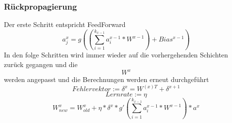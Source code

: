 \subsubsection{Rückpropagierung}
Der erste Schritt entspricht FeedForward
\begin{equation} a_{j}^{x} =  g((\sum_{i=1}^{k_{x-1}} a_{i}^{x-1} * W^{x-1})+Bias^{x-1}) \end{equation}
In den folge Schritten  wird immer wieder auf die vorhergehenden Schichten zurück gegangen und die $$W^{x}$$ werden angepasst und die Berechnungen werden erneut durchgeführt
\begin{equation} Fehlervektor := \delta^{x} = W^{(x)T} + \delta^{x+1}\end{equation}
\begin{equation}Lernrate := \eta \end{equation}
\begin{equation} W^{x}_{new} = W^{x}_{old} + \eta * \delta^{x} * g'(\sum_{i=1}^{k_{x-1}} a_{i}^{x-1} * W^{x-1})*a^{x}\end{equation}